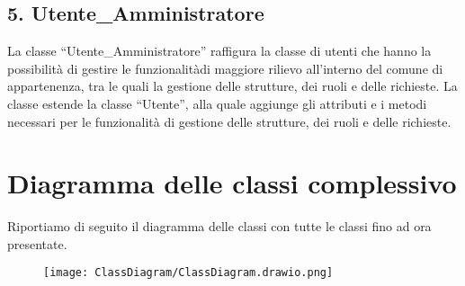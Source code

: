     \subsection*{5. Utente\_Amministratore}
        La classe ``Utente\_Amministratore'' raffigura la classe di utenti che hanno la possibilità di gestire le funzionalitàdi maggiore rilievo all'interno del comune di appartenenza, tra le quali la gestione delle strutture, dei ruoli e delle richieste. La classe estende la classe ``Utente'', alla quale aggiunge gli attributi e i metodi necessari per le funzionalità di gestione delle strutture, dei ruoli e delle richieste.

    


\section{Diagramma delle classi complessivo}
    Riportiamo di seguito il diagramma delle classi con tutte le classi fino ad ora presentate.
    \begin{figure}[H]
        \centering
        \texttt{[image: ClassDiagram/ClassDiagram.drawio.png]}
    \end{figure}